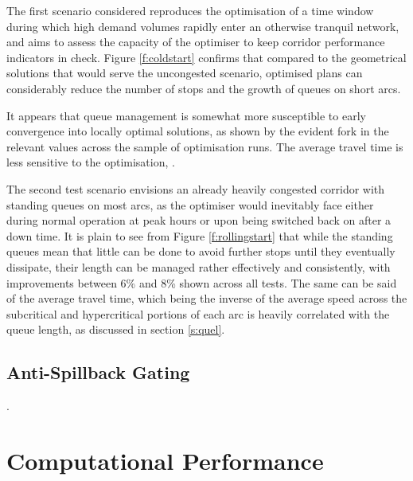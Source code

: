 The first scenario considered reproduces the optimisation of a time window during which high demand volumes rapidly enter an otherwise tranquil network, and aims to assess the capacity of the optimiser to keep corridor performance indicators in check. Figure \ref{f:coldstart} confirms that compared to the geometrical solutions that would serve the uncongested scenario, optimised plans can considerably reduce the number of stops and the growth of queues on short arcs. 


It appears that queue management is somewhat more susceptible to early convergence into locally optimal solutions, as shown by the evident fork in the relevant values across the sample of optimisation runs. The average travel time is less sensitive to the optimisation, .


The second test scenario envisions an already heavily congested  corridor with standing queues on most arcs, as the optimiser would inevitably face either during normal operation at peak hours or upon being switched back on after a down time. It is plain to see from Figure \ref{f:rollingstart} that while the standing queues mean that little can be done to avoid further stops until they eventually dissipate, their length can be managed rather effectively and consistently, with improvements between 6\% and 8\% shown across all tests. The same can be said of the average travel time, which being the inverse of the average speed across the subcritical and hypercritical portions of each arc is heavily correlated with the queue length, as discussed in section \ref{s:quel}.



\subsection{Anti-Spillback Gating}
.


\section{Computational Performance}

